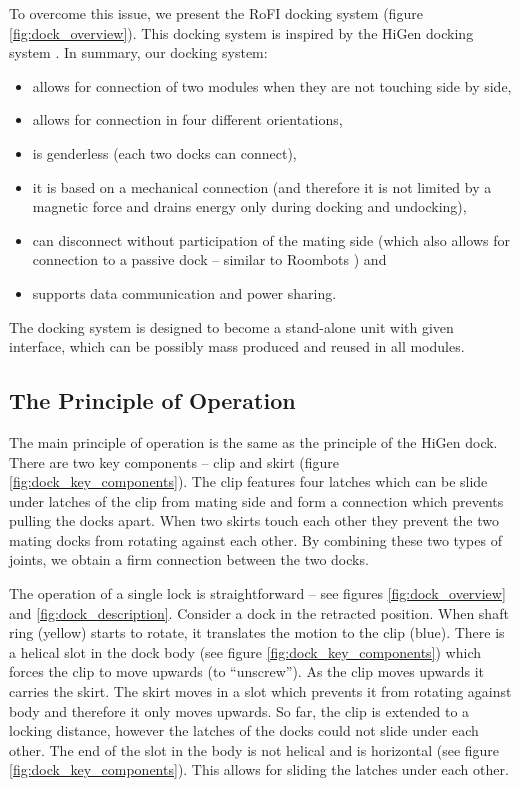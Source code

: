 To overcome this issue, we present the RoFI docking system (figure
\ref{fig:dock_overview}). This docking system is inspired by the HiGen docking
system \cite{parrott_higen:_2014}. In summary, our docking system:
\begin{itemize}
    \item allows for connection of two modules when they are not touching side
    by side,
    \item allows for connection in four different orientations,
    \item is genderless (each two docks can connect),
    \item it is based on a mechanical connection (and therefore it is not
    limited by a magnetic force and drains energy only during docking and
    undocking),
    \item can disconnect without participation of the mating side (which also
    allows for connection to a passive dock -- similar to Roombots
    \cite{bonardi_locomotion_2012}) and
    \item supports data communication and power sharing.
\end{itemize}

The docking system is designed to become a stand-alone unit with given
interface, which can be possibly mass produced and reused in all modules.

\subsection{The Principle of Operation}

The main principle of operation is the same as the principle of the HiGen dock.
There are two key components -- clip and skirt (figure
\ref{fig:dock_key_components}). The clip features four latches which can be
slide under latches of the clip from mating side and form a connection which
prevents pulling the docks apart. When two skirts touch each other they prevent
the two mating docks from rotating against each other. By combining these two
types of joints, we obtain a firm connection between the two docks.

The operation of a single lock is straightforward -- see figures
\ref{fig:dock_overview} and \ref{fig:dock_description}. Consider a dock in the
retracted position. When shaft ring (yellow) starts to rotate, it translates the
motion to the clip (blue). There is a helical slot in the dock body (see figure
\ref{fig:dock_key_components}) which forces the clip to move upwards (to
``unscrew''). As the clip moves upwards it carries the skirt. The skirt moves in a
slot which prevents it from rotating against body and therefore it only moves
upwards. So far, the clip is extended to a locking distance, however the latches
of the docks could not slide under each other. The end of the slot in the body
is not helical and is horizontal (see figure \ref{fig:dock_key_components}).
This allows for sliding the latches under each other.

